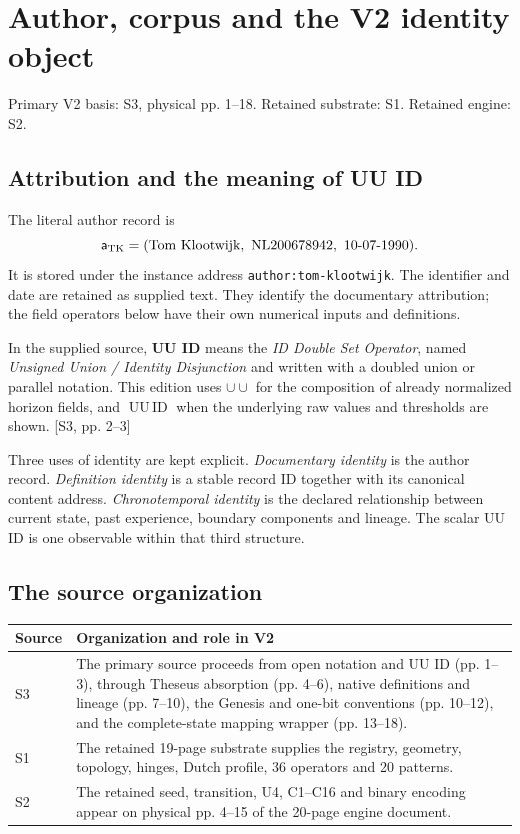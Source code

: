 \documentclass[11pt,a4paper]{article}
\numberwithin{equation}{section}
\newcommand{\src}[2]{{\sffamily\small\color{slate}[#1, #2]}}
\newcommand{\origin}[1]{{\sffamily\small\color{slate}#1}\par\vspace{3pt}}
\newcommand{\uu}{\operatorname{UU\,ID}}
\newcommand{\dcup}{\mathbin{\cup\!\cup}}
\begin{document}
\clearpage\tableofcontents\clearpage{}
\section{Author, corpus and the V2 identity object}
\label{sec:author}
\origin{Primary V2 basis: S3, physical pp. 1--18. Retained substrate: S1. Retained engine: S2.}

\subsection{Attribution and the meaning of UU ID}
The literal author record is
\begin{equation}
\mathsf a_{\rm TK}=(\text{Tom Klootwijk},\ \text{NL200678942},\ \text{10-07-1990}).
\end{equation}
It is stored under the instance address \texttt{author:tom-klootwijk}. The identifier and date are retained as supplied text. They identify the documentary attribution; the field operators below have their own numerical inputs and definitions.

In the supplied source, \textbf{UU ID} means the \emph{ID Double Set Operator}, named \emph{Unsigned Union / Identity Disjunction} and written with a doubled union or parallel notation. This edition uses $\dcup$ for the composition of already normalized horizon fields, and $\uu$ when the underlying raw values and thresholds are shown. \src{S3}{pp. 2--3}

Three uses of identity are kept explicit. \emph{Documentary identity} is the author record. \emph{Definition identity} is a stable record ID together with its canonical content address. \emph{Chronotemporal identity} is the declared relationship between current state, past experience, boundary components and lineage. The scalar UU ID is one observable within that third structure.

\subsection{The source organization}
\begin{tabularx}{\textwidth}{@{}p{}X@{}}
\toprule\textbf{Source} & \textbf{Organization and role in V2}\\\midrule
S3 & The primary source proceeds from open notation and UU ID (pp. 1--3), through Theseus absorption (pp. 4--6), native definitions and lineage (pp. 7--10), the Genesis and one-bit conventions (pp. 10--12), and the complete-state mapping wrapper (pp. 13--18).\\[5pt]
S1 & The retained 19-page substrate supplies the registry, geometry, topology, hinges, Dutch profile, 36 operators and 20 patterns.\\[5pt]
S2 & The retained seed, transition, U4, C1--C16 and binary encoding appear on physical pp. 4--15 of the 20-page engine document.\\
\bottomrule
\end{tabularx}
\end{document}
